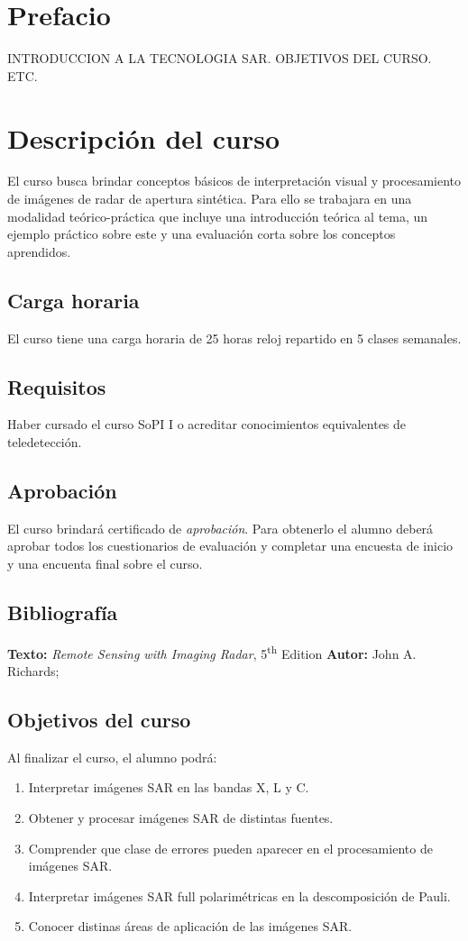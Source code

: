 \chapter{Prefacio}

INTRODUCCION A LA TECNOLOGIA SAR. OBJETIVOS DEL CURSO. ETC.

\chapter{Descripción del curso}

El curso busca brindar conceptos básicos de interpretación visual y procesamiento de imágenes de radar de apertura sintética. Para ello se trabajara en una modalidad teórico-práctica que incluye una introducción teórica al tema, un ejemplo práctico sobre este y una evaluación corta sobre los conceptos aprendidos.

\section*{Carga horaria}
El curso tiene una carga horaria de 25 horas reloj repartido en 5 clases semanales.

\section*{Requisitos} Haber cursado el curso SoPI I o acreditar conocimientos
equivalentes de teledetección.

\section*{Aprobación} El curso brindará certificado de \emph{aprobación}. Para obtenerlo el alumno deberá aprobar todos los cuestionarios de evaluación y completar una encuesta de inicio y una encuenta final sobre el curso.

\section*{Bibliografía}
\textbf {\large Texto:} \emph{Remote Sensing with Imaging Radar},
5\textsuperscript{th} Edition
\textbf {Autor:} John A. Richards; \\

\section*{Objetivos del curso}
Al finalizar el curso, el alumno podrá:
\begin{enumerate} \itemsep-0.4em
  \item Interpretar imágenes SAR en las bandas X, L y C.
  \item Obtener y procesar imágenes SAR de distintas fuentes.
  \item Comprender que clase de errores pueden aparecer en el procesamiento de imágenes SAR.
  \item Interpretar imágenes SAR full polarimétricas en la descomposición de Pauli.
  \item Conocer distinas áreas de aplicación de las imágenes SAR.
\end{enumerate}

